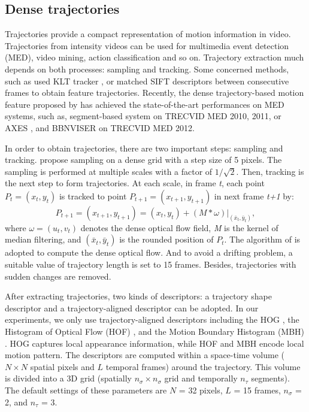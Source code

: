 \documentclass[review]{elsarticle}
\begin{document}
\subsection{Dense trajectories}
Trajectories provide a compact representation of motion information in video.
Trajectories from intensity videos can be used for multimedia event detection (MED), video mining, action classification and so on.
Trajectory extraction much depends on both processes: sampling and tracking.
Some concerned methods, such as \cite{matikainen2009trajectons, messing2009activity} used KLT tracker \cite{lucas1981iterative}, or \cite{sun2009hierarchical} matched SIFT descriptors between consecutive frames to obtain feature trajectories.
Recently, the dense trajectory-based motion feature proposed by \cite{wang2011densetraj} has achieved the state-of-the-art performances on MED systems, such as, segment-based system \cite{phan2014multimedia} on TRECVID MED 2010, 2011, or AXES \cite{oneata2012axes}, and BBNVISER \cite{natarajan2012bbn} on TRECVID MED 2012.

In order to obtain trajectories, there are two important steps: sampling and tracking. \cite{wang2011densetraj} propose sampling on a dense grid with a step size of 5 pixels. The sampling is performed at multiple scales with a factor of $1/\sqrt{2}$. Then, tracking is the next step to form trajectories. At each scale, in frame \textit{t}, each point \textit{$P_t = (x_t, y_t)$} is tracked to point \textit{$P_{t+1} = (x_{t+1}, y_{t+1})$} in next frame \textit{t+1} by:
\begin{equation}
	\textit{$P_{t+1} = (x_{t+1}, y_{t+1}) = (x_t, y_t) + (M*\omega)|_{(\bar{x}_t,\bar{y}_t)} $},
\end{equation}
where \textit{$\omega = (u_t, v_t)$} denotes the dense optical flow field, \textit{M} is the kernel of median filtering, and \textit{$(\bar{x}_t,\bar{y}_t)$} is the rounded position of \textit{$P_t$}. The algorithm of \cite{farneback2003two} is adopted to compute the dense optical flow. And to avoid a drifting problem, a suitable value of trajectory length is set to 15 frames. Besides, trajectories with sudden changes are removed.

After extracting trajectories, two kinds of descriptors: a trajectory shape descriptor and a trajectory-aligned descriptor can be adopted. In our experiments, we only use trajectory-aligned descriptors including the HOG \cite{dalal2005histograms}, the Histogram of Optical Flow (HOF) \cite{laptev2008learning}, and the Motion Boundary Histogram (MBH) \cite{dalal2006human}. HOG captures local appearance information, while HOF and MBH encode local motion pattern. The descriptors are computed within a space-time volume ($N \times N$ spatial pixels and $L$ temporal frames) around the trajectory. This volume is divided into a 3D grid (spatially $n_\sigma \times n_\sigma$ grid and temporally $n_\tau$ segments). The default settings of these parameters are $N$ = 32 pixels, $L$ = 15 frames, $n_\sigma$ = 2, and $n_\tau$ = 3.
\end{document}
